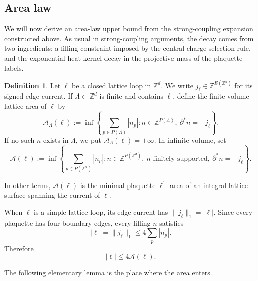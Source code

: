 \documentclass[11pt,a4paper,reqno]{amsart}
\theoremstyle{definition}
\newtheorem{definition}[theorem]{Definition}
\theoremstyle{remark}
\newcommand\Z{{\mathbb{Z}}}
\begin{document}
\subsection{Area law}\label{sec:area-law}

We will now derive an area-law upper bound from the strong-coupling expansion constructed above. As usual in strong-coupling arguments, the decay comes from two ingredients: a filling constraint imposed by the central charge selection rule, and the exponential heat-kernel decay in the projective mass of the plaquette labels.

\begin{definition}\label{def:lattice-area}
Let $\ell$ be a closed lattice loop in $\Z^d$.  We write $j_\ell\in\Z^{E(\Z^d)}$ for its signed edge-current.  If $\Lambda\subset\Z^d$ is finite and contains $\ell$, define the finite-volume lattice area of $\ell$ by
\begin{equation}
\mathcal A_\Lambda(\ell):=\inf\left\{\sum_{p\in P(\Lambda)} |n_p|:n\in\Z^{P(\Lambda)},\ \partial^*n=-j_\ell\right\}.
\end{equation}
If no such $n$ exists in $\Lambda$, we put $\mathcal A_\Lambda(\ell)=+\infty$.  In infinite volume, set
\begin{equation}
\mathcal A(\ell):=\inf\left\{\sum_{p\in P(\Z^d)} |n_p|:n\in\Z^{P(\Z^d)},\ n \text{ finitely supported},\ \partial^*n=-j_\ell\right\}.
\end{equation}
\end{definition}
In other terms, $\mathcal A(\ell)$ is the minimal plaquette $\ell^1$-area of an integral lattice surface spanning the current of $\ell$.

When $\ell$ is a simple lattice loop, its edge-current has $\|j_\ell\|_1=|\ell|$.  Since every plaquette has four boundary edges, every filling $n$ satisfies
\[
|\ell|=\|j_\ell\|_1
\le
4\sum_p |n_p|.
\]
Therefore
\begin{equation}\label{eq:bound-l}
|\ell|\le 4\mathcal A(\ell).
\end{equation}

The following elementary lemma is the place where the area enters.
\end{document}
